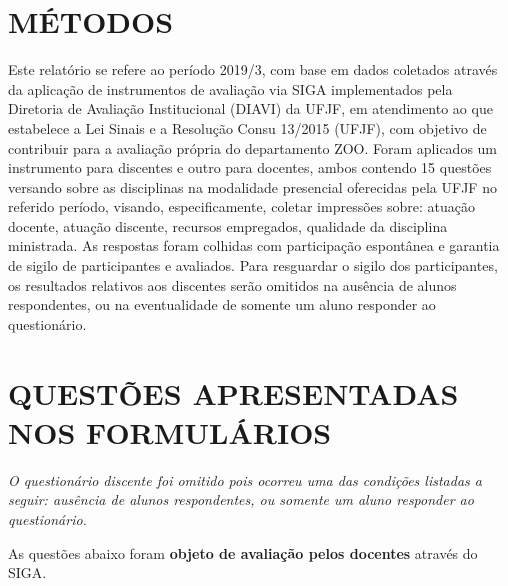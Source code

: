 \documentclass[a4paper,10pt]{article}
\begin{document}
\section{MÉTODOS}
Este relatório se refere ao período 2019/3, com base em dados     coletados através da aplicação de instrumentos de avaliação via SIGA     implementados pela Diretoria de Avaliação Institucional (DIAVI) da UFJF, em atendimento     ao que estabelece a Lei Sinais e a Resolução Consu 13/2015 (UFJF),     com objetivo de contribuir para a avaliação própria do departamento ZOO.    Foram aplicados um instrumento para discentes e outro para docentes, ambos contendo     15 questões versando sobre as disciplinas na modalidade presencial oferecidas pela UFJF no     referido período, visando, especificamente, coletar impressões sobre: atuação docente, atuação discente,     recursos empregados, qualidade da disciplina ministrada.     As respostas foram colhidas      com participação espontânea e garantia de    sigilo de participantes e avaliados. Para resguardar o sigilo dos participantes, os resultados relativos aos discentes serão omitidos na ausência de alunos respondentes, ou na eventualidade de somente um aluno responder ao questionário.
\section{QUESTÕES APRESENTADAS NOS FORMULÁRIOS}
{ \it O questionário discente foi omitido pois ocorreu uma das condições listadas a seguir: ausência de alunos respondentes, ou somente um aluno responder ao questionário.}

As questões abaixo foram {\bf objeto de avaliação pelos docentes} através do SIGA.
\end{document}

